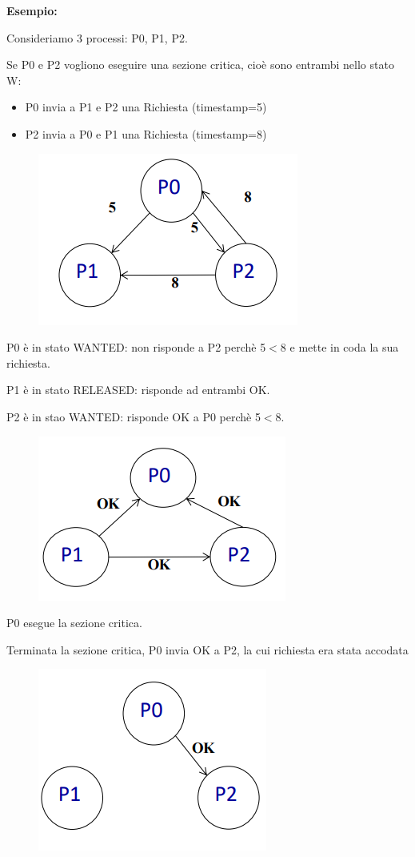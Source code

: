 \documentclass{article}
\begin{document}
\vspace{5mm}
\textbf{Esempio:}

Consideriamo 3 processi: P0, P1, P2.

Se P0 e P2 vogliono eseguire una sezione critica, cioè sono entrambi nello stato W:
\begin{itemize}
    \item P0 invia a P1 e P2 una Richiesta (timestamp=5)
    \item P2 invia a P0 e P1 una Richiesta (timestamp=8)
\end{itemize}

\begin{figure}[htbp]
    \centering
    \includegraphics[width=0.30\columnwidth]{imgs/al1.PNG}
\end{figure}

P0 è in stato WANTED: non risponde a P2 perchè 5$<$8 e mette in coda la sua richiesta.

P1 è in stato RELEASED: risponde ad entrambi OK.

P2 è in stao WANTED: risponde OK a P0 perchè 5$<$8.

\begin{figure}[htbp]
    \centering
    \includegraphics[width=0.30\columnwidth]{imgs/al2.PNG}
\end{figure}

P0 esegue la sezione critica.

Terminata la sezione critica, P0 invia OK a P2, la cui richiesta era stata accodata

\begin{figure}[htbp]
    \centering
    \includegraphics[width=0.30\columnwidth]{imgs/al3.PNG}
\end{figure}
\end{document}
